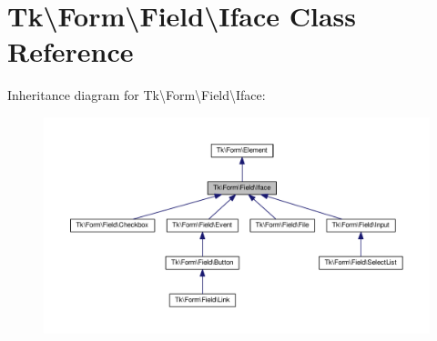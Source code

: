 \hypertarget{classTk_1_1Form_1_1Field_1_1Iface}{\section{Tk\textbackslash{}Form\textbackslash{}Field\textbackslash{}Iface Class Reference}
\label{classTk_1_1Form_1_1Field_1_1Iface}
}


Inheritance diagram for Tk\textbackslash{}Form\textbackslash{}Field\textbackslash{}Iface\+:\nopagebreak
\begin{figure}[H]
\begin{center}
\leavevmode
\includegraphics[width=350pt]{classTk_1_1Form_1_1Field_1_1Iface__inherit__graph}
\end{center}
\end{figure}

